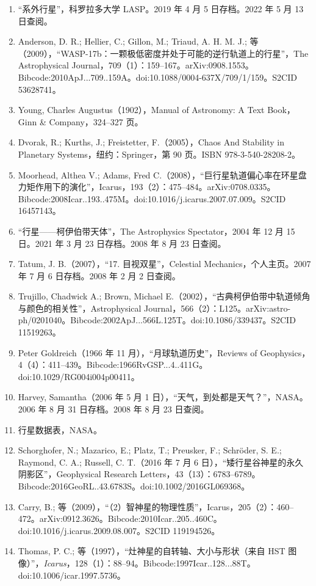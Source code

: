 \begin{enumerate}
\item “系外行星”，科罗拉多大学 LASP。2019 年 4 月 5 日存档。2022 年 5 月 13 日查阅。
\item Anderson, D. R.; Hellier, C.; Gillon, M.; Triaud, A. H. M. J.; 等（2009），“WASP-17b：一颗极低密度并处于可能的逆行轨道上的行星”，The Astrophysical Journal，709（1）：159–167。arXiv:0908.1553。Bibcode:2010ApJ...709..159A。doi:10.1088/0004-637X/709/1/159。S2CID 53628741。
\item Young, Charles Augustus（1902），Manual of Astronomy: A Text Book，Ginn & Company，324–327 页。
\item Dvorak, R.; Kurths, J.; Freistetter, F.（2005），Chaos And Stability in Planetary Systems，纽约：Springer，第 90 页。ISBN 978-3-540-28208-2。
\item Moorhead, Althea V.; Adams, Fred C.（2008），“巨行星轨道偏心率在环星盘力矩作用下的演化”，Icarus，193（2）：475–484。arXiv:0708.0335。Bibcode:2008Icar..193..475M。doi:10.1016/j.icarus.2007.07.009。S2CID 16457143。
\item “行星——柯伊伯带天体”，The Astrophysics Spectator，2004 年 12 月 15 日。2021 年 3 月 23 日存档。2008 年 8 月 23 日查阅。
\item Tatum, J. B.（2007），“17. 目视双星”，Celestial Mechanics，个人主页。2007 年 7 月 6 日存档。2008 年 2 月 2 日查阅。
\item Trujillo, Chadwick A.; Brown, Michael E.（2002），“古典柯伊伯带中轨道倾角与颜色的相关性”，Astrophysical Journal，566（2）：L125。arXiv:astro-ph/0201040。Bibcode:2002ApJ...566L.125T。doi:10.1086/339437。S2CID 11519263。
\item Peter Goldreich（1966 年 11 月），“月球轨道历史”，Reviews of Geophysics，4（4）：411–439。Bibcode:1966RvGSP...4..411G。doi:10.1029/RG004i004p00411。
\item Harvey, Samantha（2006 年 5 月 1 日），“天气，到处都是天气？”，NASA。2006 年 8 月 31 日存档。2008 年 8 月 23 日查阅。
\item 行星数据表，NASA。
\item Schorghofer, N.; Mazarico, E.; Platz, T.; Preusker, F.; Schröder, S. E.; Raymond, C. A.; Russell, C. T.（2016 年 7 月 6 日），“矮行星谷神星的永久阴影区”，Geophysical Research Letters，43（13）：6783–6789。Bibcode:2016GeoRL..43.6783S。doi:10.1002/2016GL069368。
\item Carry, B.; 等（2009），“（2）智神星的物理性质”，Icarus，205（2）：460–472。arXiv:0912.3626。Bibcode:2010Icar..205..460C。doi:10.1016/j.icarus.2009.08.007。S2CID 119194526。
\item Thomas, P. C.; 等（1997），“灶神星的自转轴、大小与形状（来自 HST 图像）”，\textit{Icarus}，128（1）：88–94。Bibcode:1997Icar..128...88T。doi:10.1006/icar.1997.5736。

\end{enumerate}
